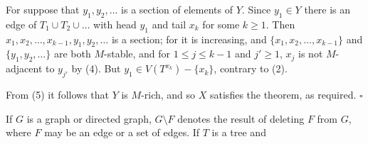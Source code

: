 For suppose that $y_1, y_2, \dots$ is a section of elements of $Y$. Since $y_1 \in Y$ there is an edge of $T_1 \cup T_2 \cup \dots$ with head $y_1$ and tail $x_k$ for some $k \ge 1$. Then $x_1, x_2, \dots, x_{k-1}, y_1, y_2, \dots$ is a section; for it is increasing, and $\{x_1, x_2, \dots, x_{k-1}\}$ and $\{y_1, y_2, \dots\}$ are both $M$-stable, and for $1 \le j \le k-1$ and $j' \ge 1$, $x_j$ is not $M$-adjacent to $y_{j'}$ by (4). But $y_1 \in V(T^{x_k}) - \{x_k\}$, contrary to (2).

From (5) it follows that $Y$ is $M$-rich, and so $X$ satisfies the theorem, as required. $\square$

If $G$ is a graph or directed graph, $G\setminus F$ denotes the result of deleting $F$ from $G$, where $F$ may be an edge or a set of edges. If $T$ is a tree and
